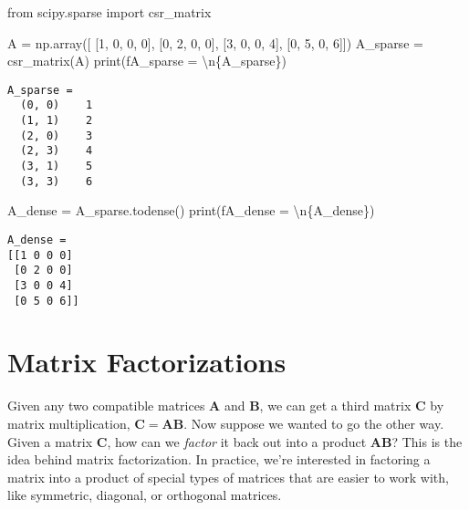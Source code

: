 \documentclass[
  letterpaper,
  DIV=11,
  numbers=noendperiod]{scrreprt}
\newenvironment{Shaded}{\begin{snugshade}}{\end{snugshade}}
\newcommand{\BuiltInTok}[1]{\textcolor[rgb]{0.00,0.23,0.31}{#1}}
\newcommand{\CharTok}[1]{\textcolor[rgb]{0.13,0.47,0.30}{#1}}
\newcommand{\DecValTok}[1]{\textcolor[rgb]{0.68,0.00,0.00}{#1}}
\newcommand{\ImportTok}[1]{\textcolor[rgb]{0.00,0.46,0.62}{#1}}
\newcommand{\NormalTok}[1]{\textcolor[rgb]{0.00,0.23,0.31}{#1}}
\newcommand{\OperatorTok}[1]{\textcolor[rgb]{0.37,0.37,0.37}{#1}}
\newcommand{\SpecialCharTok}[1]{\textcolor[rgb]{0.37,0.37,0.37}{#1}}
\newcommand{\SpecialStringTok}[1]{\textcolor[rgb]{0.13,0.47,0.30}{#1}}
\begin{document}
\begin{Shaded}
\begin{Highlighting}[]
\ImportTok{from}\NormalTok{ scipy.sparse }\ImportTok{import}\NormalTok{ csr\_matrix}

\NormalTok{A }\OperatorTok{=}\NormalTok{ np.array([}
\NormalTok{    [}\DecValTok{1}\NormalTok{, }\DecValTok{0}\NormalTok{, }\DecValTok{0}\NormalTok{, }\DecValTok{0}\NormalTok{], }
\NormalTok{    [}\DecValTok{0}\NormalTok{, }\DecValTok{2}\NormalTok{, }\DecValTok{0}\NormalTok{, }\DecValTok{0}\NormalTok{], }
\NormalTok{    [}\DecValTok{3}\NormalTok{, }\DecValTok{0}\NormalTok{, }\DecValTok{0}\NormalTok{, }\DecValTok{4}\NormalTok{], }
\NormalTok{    [}\DecValTok{0}\NormalTok{, }\DecValTok{5}\NormalTok{, }\DecValTok{0}\NormalTok{, }\DecValTok{6}\NormalTok{]])}
\NormalTok{A\_sparse }\OperatorTok{=}\NormalTok{ csr\_matrix(A)}
\BuiltInTok{print}\NormalTok{(}\SpecialStringTok{f\textquotesingle{}A\_sparse = }\CharTok{\textbackslash{}n}\SpecialCharTok{\{}\NormalTok{A\_sparse}\SpecialCharTok{\}}\SpecialStringTok{\textquotesingle{}}\NormalTok{)}
\end{Highlighting}
\end{Shaded}

\begin{verbatim}
A_sparse = 
  (0, 0)    1
  (1, 1)    2
  (2, 0)    3
  (2, 3)    4
  (3, 1)    5
  (3, 3)    6
\end{verbatim}

\begin{Shaded}
\begin{Highlighting}[]
\NormalTok{A\_dense }\OperatorTok{=}\NormalTok{ A\_sparse.todense()}
\BuiltInTok{print}\NormalTok{(}\SpecialStringTok{f\textquotesingle{}A\_dense = }\CharTok{\textbackslash{}n}\SpecialCharTok{\{}\NormalTok{A\_dense}\SpecialCharTok{\}}\SpecialStringTok{\textquotesingle{}}\NormalTok{)}
\end{Highlighting}
\end{Shaded}

\begin{verbatim}
A_dense = 
[[1 0 0 0]
 [0 2 0 0]
 [3 0 0 4]
 [0 5 0 6]]
\end{verbatim}

\hypertarget{matrix-factorizations}{%
\section{Matrix Factorizations}\label{matrix-factorizations}}

Given any two compatible matrices \(\mathbf{A}\) and \(\mathbf{B}\), we
can get a third matrix \(\mathbf{C}\) by matrix multiplication,
\(\mathbf{C} = \mathbf{A}\mathbf{B}\). Now suppose we wanted to go the
other way. Given a matrix \(\mathbf{C}\), how can we \emph{factor} it
back out into a product \(\mathbf{A}\mathbf{B}\)? This is the idea
behind matrix factorization. In practice, we're interested in factoring
a matrix into a product of special types of matrices that are easier to
work with, like symmetric, diagonal, or orthogonal matrices.
\end{document}
